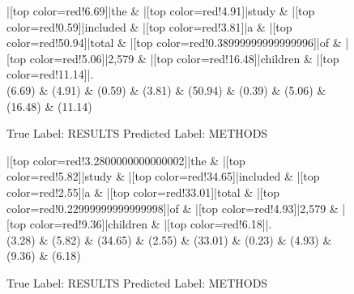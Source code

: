 \documentclass[a4paper, landscape]{article}
\begin{document}
\begin{figure}
\begin{center}
\begin{dependency}
\begin{deptext}
|[top color=red!6.69]|the \& |[top color=red!4.91]|study \& |[top color=red!0.59]|included \& |[top color=red!3.81]|a \& |[top color=red!50.94]|total \& |[top color=red!0.38999999999999996]|of \& |[top color=red!5.06]|2,579 \& |[top color=red!16.48]|children \& |[top color=red!11.14]|.\\
(6.69) \& (4.91) \& (0.59) \& (3.81) \& (50.94) \& (0.39) \& (5.06) \& (16.48) \& (11.14)\\
\end{deptext}
\end{dependency}
\end{center}
\caption{True Label: RESULTS Predicted Label: METHODS}
\end{figure}
\clearpage
\begin{figure}
\begin{center}
\begin{dependency}
\begin{deptext}
|[top color=red!3.2800000000000002]|the \& |[top color=red!5.82]|study \& |[top color=red!34.65]|included \& |[top color=red!2.55]|a \& |[top color=red!33.01]|total \& |[top color=red!0.22999999999999998]|of \& |[top color=red!4.93]|2,579 \& |[top color=red!9.36]|children \& |[top color=red!6.18]|.\\
(3.28) \& (5.82) \& (34.65) \& (2.55) \& (33.01) \& (0.23) \& (4.93) \& (9.36) \& (6.18)\\
\end{deptext}
\end{dependency}
\end{center}
\caption{True Label: RESULTS Predicted Label: METHODS}
\end{figure}
\clearpage
\end{document}
